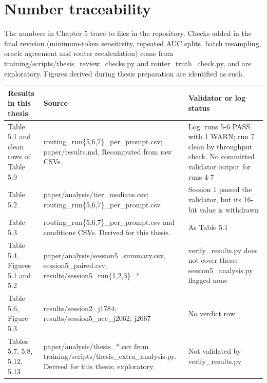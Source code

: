\appendix
\chapter{Number traceability}
The numbers in Chapter 5 trace to files in the repository. Checks added in the final revision (minimum-token sensitivity, repeated AUC splits, batch resampling, oracle agreement and router recalculation) come from training/scripts/thesis\_\allowbreak{}review\_\allowbreak{}checks.py and router\_\allowbreak{}truth\_\allowbreak{}check.py, and are exploratory. Figures derived during thesis preparation are identified as such.


\begingroup\footnotesize\setlength{\tabcolsep}{4pt}
\begin{longtable}{>{\raggedright\arraybackslash}p{35.1mm}>{\raggedright\arraybackslash}p{57.8mm}>{\raggedright\arraybackslash}p{48.7mm}}
\toprule
\textbf{Results in this thesis} & \textbf{Source} & \textbf{Validator or log status} \\
\midrule
\endhead
Table 5.1 and clean rows of Table 5.9 & routing\_\allowbreak{}run\{5,6,7\}\_\allowbreak{}per\_\allowbreak{}prompt.csv; paper/results.md. Recomputed from raw CSVs. & Log: runs 5-6 PASS with 1 WARN; run 7 clean by throughput check. No committed validator output for runs 4-7 \\*
Table 5.2 & paper/analysis/tier\_\allowbreak{}medians.csv; routing\_\allowbreak{}run\{5,6,7\}\_\allowbreak{}per\_\allowbreak{}prompt.csv & Session 1 passed the validator, but its 16-bit value is withdrawn \\
Table 5.3 & routing\_\allowbreak{}run\{5,6,7\}\_\allowbreak{}per\_\allowbreak{}prompt.csv and conditions CSVs. Derived for this thesis. & As Table 5.1 \\
Table 5.4, Figures 5.1 and 5.2 & paper/analysis/session5\_\allowbreak{}summary.csv, session5\_\allowbreak{}paired.csv; results/session5\_\allowbreak{}run\{1,2,3\}\_\allowbreak{}* & verify\_\allowbreak{}results.py does not cover these; session5\_\allowbreak{}analysis.py flagged none \\
Table 5.6, Figure 5.3 & results/session2\_\allowbreak{}j1784; results/session5\_\allowbreak{}acc\_\allowbreak{}j2062, j2067 & No verdict row \\
Tables 5.7, 5.8, 5.12, 5.13 & paper/analysis/thesis\_\allowbreak{}*.csv from training/scripts/thesis\_\allowbreak{}extra\_\allowbreak{}analysis.py. Derived for this thesis; exploratory. & Not validated by verify\_\allowbreak{}results.py \\

\end{longtable}
